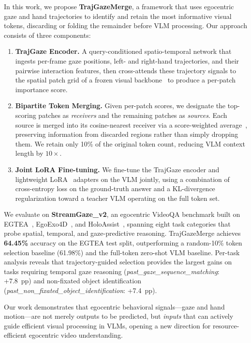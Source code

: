 In this work, we propose \textbf{TrajGazeMerge}, a framework that uses egocentric gaze and hand
trajectories to identify and retain the most informative visual tokens, discarding or folding the
remainder before VLM processing.
Our approach consists of three components:

\begin{enumerate}[leftmargin=*,itemsep=2pt,topsep=2pt]
\item \textbf{TrajGaze Encoder.} A query-conditioned spatio-temporal network that ingests
    per-frame gaze positions, left- and right-hand trajectories, and their pairwise interaction
    features, then cross-attends these trajectory signals to the spatial patch grid of a frozen
    visual backbone~\cite{oquab2023dinov2} to produce a per-patch importance score.

\item \textbf{Bipartite Token Merging.} Given per-patch scores, we designate the top-scoring
    patches as \emph{receivers} and the remaining patches as \emph{sources}.
    Each source is merged into its cosine-nearest receiver via a score-weighted average~\cite{bolya2023tome},
    preserving information from discarded regions rather than simply dropping them.
    We retain only 10\% of the original token count, reducing VLM context length by $10\times$.

\item \textbf{Joint LoRA Fine-tuning.} We fine-tune the TrajGaze encoder and lightweight
    LoRA~\cite{hu2022lora} adapters on the VLM jointly, using a combination of cross-entropy
    loss on the ground-truth answer and a KL-divergence regularization toward a teacher VLM
    operating on the full token set.
\end{enumerate}

We evaluate on \textbf{StreamGaze\_v2}, an egocentric VideoQA benchmark built on
EGTEA~\cite{li2018egtea}, EgoExo4D~\cite{grauman2024egoexo4d}, and
HoloAssist~\cite{wang2023holoassist}, spanning eight task categories that probe spatial,
temporal, and gaze-predictive reasoning.
TrajGazeMerge achieves \textbf{64.45\%} accuracy on the EGTEA test split, outperforming a
random-10\% token selection baseline (61.98\%) and the full-token zero-shot VLM baseline.
Per-task analysis reveals that trajectory-guided selection provides the largest gains on tasks
requiring temporal gaze reasoning (\emph{past\_gaze\_sequence\_matching}: +7.8~pp) and
non-fixated object identification (\emph{past\_non\_fixated\_object\_identification}: +7.4~pp).

Our work demonstrates that egocentric behavioral signals—gaze and hand motion—are not merely
outputs to be predicted, but \emph{inputs} that can actively guide efficient visual processing
in VLMs, opening a new direction for resource-efficient egocentric video understanding.

